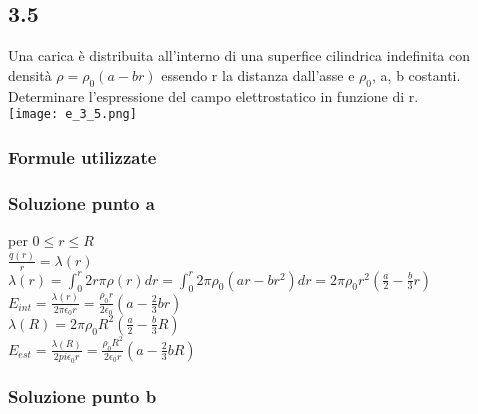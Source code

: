 \documentclass[../../main.tex]{subfiles}
\begin{document}
\subsection*{3.5}
Una carica è distribuita all'interno di una superfice cilindrica indefinita con densità $\rho = \rho_0(a-br)$ essendo r la distanza dall'asse e $\rho_0$, a, b costanti.
\\Determinare l'espressione del campo elettrostatico in funzione di r.
\\\texttt{[image: e\_3\_5.png]}
\subsubsection*{Formule utilizzate}
\subsubsection*{Soluzione punto a}
per $0 \le r \le R$
\\$\frac{q(r)}{r} = \lambda (r)$
\\$\lambda(r) = \int_0^r 2r\pi\rho(r) dr= \int_0^r2\pi\rho_0(ar-br^2)dr = 2 \pi\rho_0r^2\left(\frac{a}{2}-\frac{b}{3}r\right)$
\\$E_{int} = \frac{\lambda(r)}{2\pi\epsilon_0r} = \frac{\rho_0r}{2\epsilon_0}\left(a- \frac{2}{3}br\right)$
\\$\lambda(R) = 2\pi\rho_0 R^2\left(\frac{a}{2}-\frac{b}{3}R\right)$
\\$E_{est} = \frac{\lambda(R)}{2pi\epsilon_0r} = \frac{\rho_0R^2}{2\epsilon_0r}\left(a-\frac{2}{3}bR\right)$
\subsubsection*{Soluzione punto b}
\newpage
\end{document}
